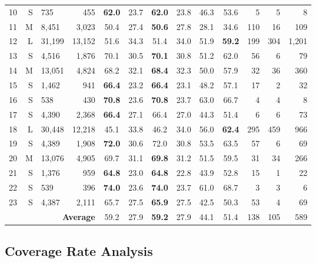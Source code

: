 \begin{table}[ht]
\begin{tabular}{rrlr|cc|cc|c|c|rrr}
10 & S &    735   &    455   & \textbf{62.0} & 23.7 & \textbf{62.0} & 23.8 & 46.3 & 53.6 &       5 &      5 &     8 \\
11 & M &  8{,}451 &  3{,}023 & 50.4 & 27.4 & \textbf{50.6} & 27.8 & 28.1 & 34.6 &     110 &     16 &   109 \\
12 & L & 31{,}199 & 13{,}152 & 51.6 & 34.3 & 51.4 & 34.0 & 51.9 & \textbf{59.2} &     199 &    304 & 1{,}201 \\
13 & S &  4{,}516 &  1{,}876 & 70.1 & 30.5 & \textbf{70.1} & 30.8 & 51.2 & 62.0 &      56 &      6 &    79 \\
14 & M & 13{,}051 &  4{,}824 & 68.2 & 32.1 & \textbf{68.4} & 32.3 & 50.0 & 57.9 &      32 &     36 &   360 \\
15 & S &  1{,}462 &    941   & \textbf{66.4} & 23.2 & \textbf{66.4} & 23.1 & 48.2 & 57.1 &      17 &      2 &    32 \\
16 & S &    538   &    430   & \textbf{70.8} & 23.6 & \textbf{70.8} & 23.7 & 63.0 & 66.7 &       4 &      4 &     8 \\
17 & S &  4{,}390 &  2{,}368 & \textbf{66.4} & 27.1 & 66.4 & 27.0 & 44.3 & 51.4 &       6 &      6 &    73 \\
18 & L & 30{,}448 & 12{,}218 & 45.1 & 33.8 & 46.2 & 34.0 & 56.0 & \textbf{62.4} &     295 &    459 &   966 \\
19 & S &  4{,}389 &  1{,}908 & \textbf{72.0} & 30.6 & 72.0 & 30.8 & 53.5 & 63.5 &      57 &      6 &    69 \\
20 & M & 13{,}076 &  4{,}905 & 69.7 & 31.1 & \textbf{69.8} & 31.2 & 51.5 & 59.5 &      31 &     34 &   266 \\
21 & S &  1{,}376 &    959   & \textbf{64.8} & 23.0 & \textbf{64.8} & 22.8 & 43.9 & 52.8 &      15 &      1 &    22 \\
22 & S &    539   &    396   & \textbf{74.0} & 23.6 & \textbf{74.0} & 23.7 & 61.0 & 68.7 &       3 &      3 &     6 \\
23 & S &  4{,}387 &  2{,}111 & 65.7 & 27.5 & \textbf{65.9} & 27.5 & 42.5 & 50.3 &      53 &      4 &    69 \\
\midrule
\multicolumn{4}{r|}{\textbf{Average}} &
59.2 & 27.9 & \textbf{59.2} & 27.9 & 44.1 & 51.4 & 138 & 105 & 589 \\
\bottomrule
\end{tabular}
\end{table}

\subsection{Coverage Rate Analysis}\label{subsec:coverage_analysis}

